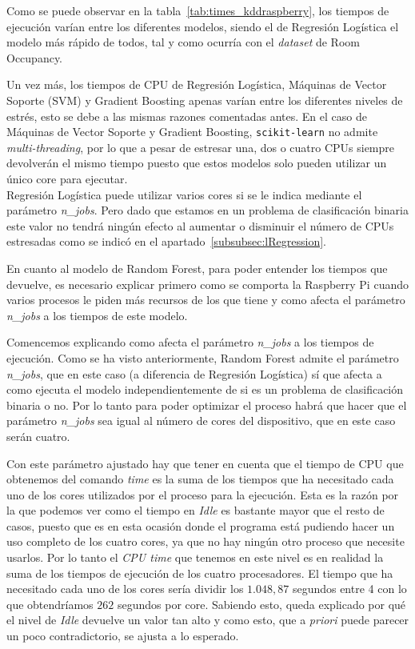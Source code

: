 \documentclass[a4paper, 12pt]{book}
\begin{document}
Como se puede observar en la tabla~\ref{tab:times_kddraspberry}, los tiempos de ejecución varían entre los diferentes modelos, siendo el de Regresión Logística el modelo más rápido de todos, tal y como ocurría con el \textit{dataset} de Room Occupancy.

Un vez más, los tiempos de CPU de Regresión Logística, Máquinas de Vector Soporte (SVM) y Gradient Boosting apenas varían entre los diferentes niveles de estrés, esto se debe a las mismas razones comentadas antes. En el caso de Máquinas de Vector Soporte y Gradient Boosting, \texttt{scikit-learn} no admite \textit{multi-threading}, por lo que a pesar de estresar una, dos o cuatro CPUs siempre devolverán el mismo tiempo puesto que estos modelos solo pueden utilizar un único core para ejecutar.\\
Regresión Logística puede utilizar varios cores si se le indica mediante el parámetro \textit{n\_jobs}. Pero dado que estamos en un problema de clasificación binaria este valor no tendrá ningún efecto al aumentar o disminuir el número de CPUs estresadas como se indicó en el apartado~\ref{subsubsec:lRegression}. 

En cuanto al modelo de Random Forest, para poder entender los tiempos que devuelve, es necesario explicar primero como se comporta la Raspberry Pi cuando varios procesos le piden más recursos de los que tiene y como afecta el parámetro \textit{n\_jobs} a los tiempos de este modelo.

Comencemos explicando como afecta el parámetro \textit{n\_jobs} a los tiempos de ejecución. Como se ha visto anteriormente, Random Forest admite el parámetro \textit{n\_jobs}, que en este caso (a diferencia de Regresión Logística) sí que afecta a como ejecuta el modelo independientemente de si es un problema de clasificación binaria o no. Por lo tanto para poder optimizar el proceso habrá que hacer que el parámetro \textit{n\_jobs} sea igual al número de cores del dispositivo, que en este caso serán cuatro. 

Con este parámetro ajustado hay que tener en cuenta que el tiempo de CPU que obtenemos del comando \textit{time} es la suma de los tiempos que ha necesitado cada uno de los cores utilizados por el proceso para la ejecución. Esta es la razón por la que podemos ver como el tiempo en \textit{Idle} es bastante mayor que el resto de casos, puesto que es en esta ocasión donde el programa está pudiendo hacer un uso completo de los cuatro cores, ya que no hay ningún otro proceso que necesite usarlos. Por lo tanto el \textit{CPU time} que tenemos en este nivel es en realidad la suma de los tiempos de ejecución de los cuatro procesadores. El tiempo que ha necesitado cada uno de los cores sería dividir los $1.048,87$ segundos entre 4 con lo que obtendríamos $262$ segundos por core. Sabiendo esto, queda explicado por qué el nivel de \textit{Idle} devuelve un valor tan alto y como esto, que a \textit{priori} puede parecer un poco contradictorio, se ajusta a lo esperado.
\end{document}
